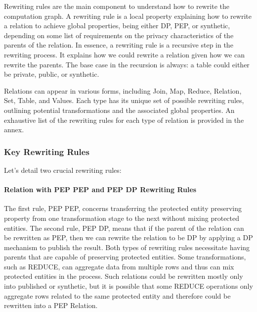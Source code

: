 \documentclass[letterpaper]{article} %
\begin{document}
Rewriting rules are the main component to understand how to rewrite the computation graph. A rewriting rule is a local property explaining how to rewrite a relation to achieve global properties, being either DP, PEP, or synthetic, depending on some list of requirements on the privacy characteristics of the parents of the relation. In essence, a rewriting rule is a recursive step in the rewriting process. It explains how we could rewrite a relation given how we can rewrite the parents. The base case in the recursion is always: a table could either be private, public, or synthetic.

Relations can appear in various forms, including Join, Map, Reduce, Relation, Set, Table, and Values. Each type has its unique set of possible rewriting rules, outlining potential transformations and the associated global properties. An exhaustive list of the rewriting rules for each type of relation is provided in the annex.

\subsubsection{Key Rewriting Rules}

Let’s detail two crucial rewriting rules:

\paragraph{Relation with PEP \textrightarrow{} PEP and PEP \textrightarrow{} DP Rewriting Rules}
The first rule, PEP \textrightarrow{} PEP, concerns transferring the protected entity preserving property from one transformation stage to the next without mixing protected entities. The second rule, PEP \textrightarrow{} DP, means that if the parent of the relation can be rewritten as PEP, then we can rewrite the relation to be DP by applying a DP mechanism to publish the result. Both types of rewriting rules necessitate having parents that are capable of preserving protected entities. Some transformations, such as REDUCE, can aggregate data from multiple rows and thus can mix protected entities in the process. Such relations could be rewritten mostly only into published or synthetic, but it is possible that some REDUCE operations only aggregate rows related to the same protected entity and therefore could be rewritten into a PEP Relation.
\end{document}

